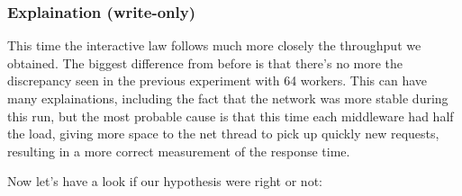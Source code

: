 \documentclass[11pt,a4paper]{article}
\begin{document}
\subsubsection{Explaination (write-only)}

This time the interactive law follows much more closely the throughput we obtained. The biggest difference from
before is that there's no more the discrepancy seen in the previous experiment with 64 workers. This can have many
explainations, including the fact that the network was more stable during this run, but the most probable cause is 
that this time each middleware had half the load, giving more space to the net thread to pick up quickly new requests,
resulting in a more correct measurement of the response time.

Now let's have a look if our hypothesis were right or not: %
\end{document}

